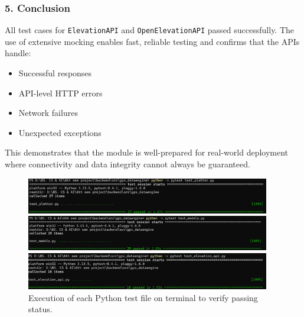 \documentclass[12pt]{article}
\begin{document}
\subsubsection*{5. Conclusion}
All test cases for \texttt{ElevationAPI} and \texttt{OpenElevationAPI} passed successfully. The use of extensive mocking enables fast, reliable testing and confirms that the APIs handle:
\begin{itemize}
  \item Successful responses
  \item API-level HTTP errors
  \item Network failures
  \item Unexpected exceptions
\end{itemize}
This demonstrates that the module is well-prepared for real-world deployment where connectivity and data integrity cannot always be guaranteed.

\begin{figure}[h!]
    \centering
    \includegraphics[width=0.95\textwidth]{Project_Screenshots/plotter.png}
   
    \includegraphics[width=0.95\textwidth]{Project_Screenshots/model.png}

    \includegraphics[width=0.95\textwidth]{Project_Screenshots/elevation.png}
    \caption{Execution of each Python test file on terminal to verify passing status.}
    \label{fig:test-py-outputs}
\end{figure}


\clearpage

\newpage
\end{document}
